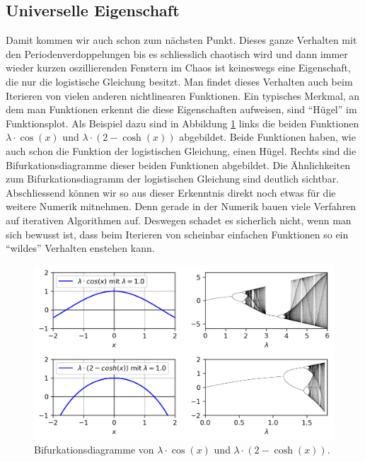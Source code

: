 \subsection{Universelle Eigenschaft}
Damit kommen wir auch schon zum nächsten Punkt. 
Dieses ganze Verhalten mit den Periodenverdoppelungen 
bis es schliesslich chaotisch wird und dann
immer wieder kurzen oszillierenden Fenstern im Chaos
ist keineswegs eine Eigenschaft, 
die nur die logistische Gleichung besitzt.
Man findet dieses Verhalten auch beim Iterieren 
von vielen anderen nichtlinearen Funktionen. 
Ein typisches Merkmal, 
an dem man Funktionen erkennt
die diese Eigenschaften aufweisen, 
sind ``Hügel'' im Funktionsplot.
Als Beispiel dazu sind in Abbildung \ref{fig:universal} links
die beiden Funktionen
$\lambda \cdot \cos(x)$
und
$\lambda \cdot (2 - \cosh(x))$
abgebildet.
Beide Funktionen haben, wie auch schon die Funktion
der logistischen Gleichung, einen Hügel. 
Rechts sind die Bifurkationsdiagramme dieser beiden
Funktionen abgebildet. 
Die Ähnlichkeiten zum Bifurkationsdiagramm der logistischen
Gleichung sind deutlich sichtbar. 
Abschliessend können wir so aus dieser Erkenntnis direkt 
noch etwas für die weitere Numerik mitnehmen.
Denn gerade in der Numerik bauen viele Verfahren
auf iterativen Algorithmen auf. 
Deswegen schadet es sicherlich nicht,
wenn man sich bewusst ist, dass beim Iterieren von
scheinbar einfachen Funktionen so ein ``wildes'' 
Verhalten enstehen kann. 
\begin{figure}
    \includegraphics[width=\linewidth]{papers/logistic/figures/universal.png}
    \caption{
        Bifurkationsdiagramme von 
        $\lambda \cdot \cos(x)$
        und
        $\lambda \cdot (2 - \cosh(x))$.
    }
    \label{fig:universal}
\end{figure}
